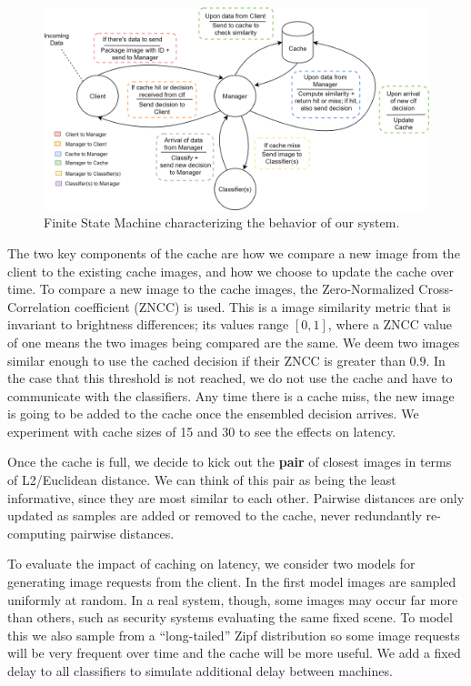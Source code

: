 \documentclass[11pt]{article}
\begin{document}
\begin{figure}[t]
    \centering
    \includegraphics[scale=0.15]{FSM.png}
    \caption{Finite State Machine characterizing the behavior of our system.}
    \label{fig:fsm}
\end{figure}

The two key components of the cache are how we compare a new image from the client to the existing cache images, and how we choose to update the cache over time. To compare a new image to the cache images, the Zero-Normalized Cross-Correlation coefficient (ZNCC) is used. This is a image similarity metric that is invariant to brightness differences; its values range $[0,1]$, where a ZNCC value of one means the two images being compared are the same. We deem two images similar enough to use the cached decision if their ZNCC is greater than $0.9$. In the case that this threshold is not reached, we do not use the cache and have to communicate with the classifiers. Any time there is a cache miss, the new image is going to be added to the cache once the ensembled decision arrives. We experiment with cache sizes of 15 and 30 to see the effects on latency. 

Once the cache is full, we decide to kick out the \textbf{pair} of closest images in terms of L2/Euclidean distance. We can think of this pair as being the least informative, since they are most similar to each other. Pairwise distances are only updated as samples are added or removed to the cache, never redundantly re-computing pairwise distances.

To evaluate the impact of caching on latency, we consider two models for generating image requests from the client. In the first model images are sampled uniformly at random. In a real system, though, some images may occur far more than others, such as security systems evaluating the same fixed scene. To model this we also sample from a ``long-tailed'' Zipf distribution so some image requests will be very frequent over time and the cache will be more useful.
We add a fixed delay to all classifiers to simulate additional delay between machines.
\end{document}
